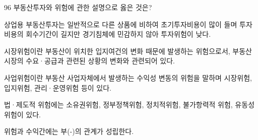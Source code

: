 \begin{question}{96}
부동산투자와 위험에 관한 설명으로 옳은 것은?
\begin{choices}
  \item 상업용 부동산투자는 일반적으로 다른 상품에 비하여 초기투자비용이 많이 들며 투자비용의 회수기간이 길지만 경기침체에 민감하지 않아 투자위험이 낮다.
  \item 시장위험이란 부동산이 위치한 입지여건의 변화 때문에 발생하는 위험으로서, 부동산시장의 수요·공급과 관련된 상황의 변화와 관련되어 있다.
  \item 사업위험이란 부동산 사업자체에서 발생하는 수익성 변동의 위험을 말하며 시장위험, 입지위험, 관리·운영위험 등이 있다.
  \item 법·제도적 위험에는 소유권위험, 정부정책위험, 정치적위험, 불가항력적 위험, 유동성위험이 있다.
  \item 위험과 수익간에는 부(-)의 관계가 성립한다.
\end{choices}
\end{question}
